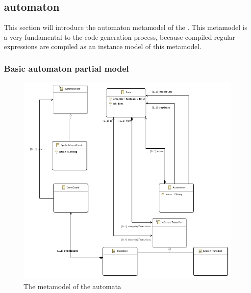 \subsection{\viatrac{} automaton}
\label{sec:metamodel}

This section will introduce the automaton metamodel of the \viatrac{}. This metamodel is a very fundamental to the code generation process, because compiled regular expressions are compiled as an instance model of this metamodel.

\subsubsection{Basic automaton partial model}

\begin{figure}[h]
	\centering
	\includegraphics[width = \textwidth]{include/figures/basic_automaton}
	\caption{The \emf{} metamodel of the \viatrac{} automata}
\label{fig:basic_automaton}
\end{figure}

